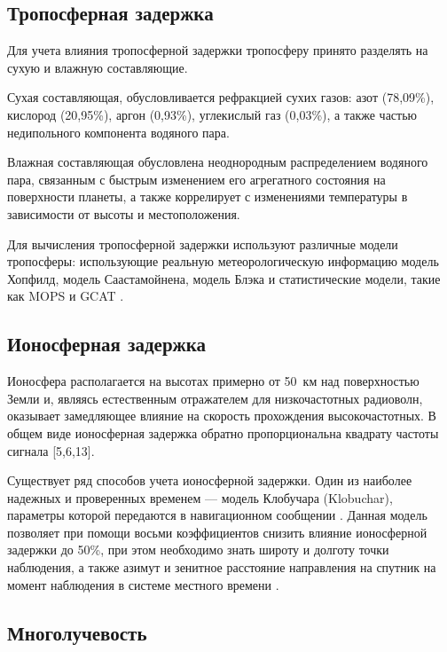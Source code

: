 
\subsection{Тропосферная задержка}\label{subsec:ch1/sec3/sub4}

Для учета влияния тропосферной задержки тропосферу принято разделять на сухую и влажную составляющие.

Сухая составляющая, обусловливается рефракцией сухих газов: азот (78,09\%), кислород (20,95\%), аргон (0,93\%), углекислый газ (0,03\%), а также частью недипольного компонента водяного пара.

Влажная составляющая обусловлена неоднородным распределением водяного пара, связанным с быстрым изменением его агрегатного состояния на поверхности планеты, а также коррелирует с изменениями температуры в зависимости от высоты и местоположения.

Для вычисления тропосферной задержки используют различные модели тропосферы: использующие реальную метеорологическую информацию модель Хопфилд, модель Саастамойнена, модель Блэка и статистические модели, такие как MOPS и GCAT \cite{src48, src61, src62, src70}.

\subsection{Ионосферная задержка}\label{subsec:ch1/sec3/sub5}

Ионосфера располагается на высотах примерно от 50~км над поверхностью Земли и, являясь естественным отражателем для низкочастотных радиоволн, оказывает замедляющее влияние на скорость прохождения высокочастотных. В общем виде ионосферная задержка обратно пропорциональна квадрату частоты сигнала \cite{src05, src06, src13} [5,6,13].

Существует ряд способов учета ионосферной задержки. Один из наиболее надежных и проверенных временем --- модель Клобучара (Klobuchar), параметры которой передаются в навигационном сообщении \cite{src64}. Данная модель позволяет при помощи восьми коэффициентов снизить влияние ионосферной задержки до 50\%, при этом необходимо знать широту и долготу точки наблюдения, а также азимут и зенитное расстояние направления на спутник на момент наблюдения в системе местного времени \cite{src41, src46}.

\subsection{Многолучевость}\label{subsec:ch1/sec3/sub6}

